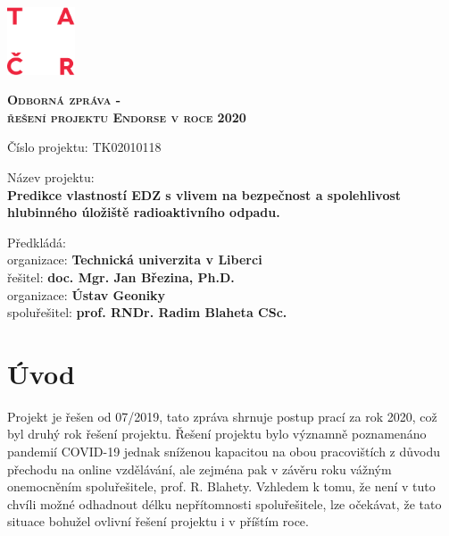 \documentclass[11pt,a4paper]{article}
\begin{document}
\begin{onehalfspacing} 


\begin{titlepage}
    \includegraphics[width=2cm]{logo_TACR_zakl.pdf}

    \vspace{6cm}
    {\centering	
      {\scshape\bf\huge Odborná zpráva - \\
      řešení projektu Endorse v roce 2020\par}
    }
	
    \vspace{3cm}	
    {\LARGE
      {\noindent Číslo projektu:  TK02010118
        {\bfseries }\par}
      \vspace{2ex}
      {\noindent Název projektu: \\
        {\bfseries Predikce vlastností EDZ s vlivem na bezpečnost a spolehlivost
         hlubinného úložiště radioaktivního odpadu.} \par}
      \vspace{2ex}
      {\noindent Předkládá: \\
      \-\hspace{2ex} organizace: {\bfseries Technická univerzita v Liberci}\\
      \-\hspace{2ex} řešitel: {\bfseries doc. Mgr. Jan Březina, Ph.D.}\\
      \-\hspace{2ex} organizace: {\bfseries Ústav Geoniky}\\
      \-\hspace{2ex} spoluřešitel: {\bfseries prof. RNDr. Radim Blaheta CSc.}\par}

    }  
    \vfill
\end{titlepage}



\section{Úvod}
Projekt je řešen od 07/2019, tato zpráva shrnuje postup prací za rok 2020, což byl druhý rok řešení projektu. Řešení projektu bylo významně poznamenáno pandemií COVID-19 jednak sníženou kapacitou na obou pracovištích z důvodu přechodu na online vzdělávání, ale zejména pak v závěru roku vážným onemocněním spoluřešitele, prof. R. Blahety. Vzhledem k tomu, že není v tuto chvíli možné odhadnout délku nepřítomnosti spoluřešitele, lze očekávat, že tato situace bohužel ovlivní řešení projektu i v příštím roce. 



\end{onehalfspacing}
\end{document}
